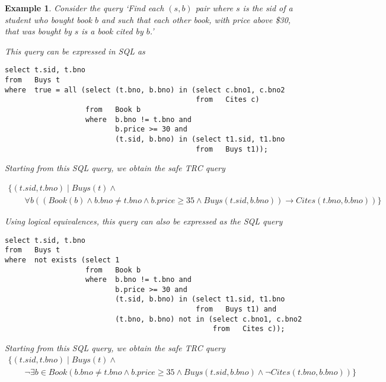 \documentclass[11pt]{article}
\newtheorem{example}{Example}
\begin{document}
\begin{example}
\label{TranslatedSQLtoSafeTRC}
Consider the query `\emph{Find each $(s,b)$ pair where $s$ is the
sid of a student who bought book $b$ and such that each other book, with price above \$30, that was bought by $s$ is a book cited by $b$}.'


This query can be expressed in SQL as
{\small
\begin{verbatim}
select t.sid, t.bno
from   Buys t
where  true = all (select (t.bno, b.bno) in (select c.bno1, c.bno2
                                             from   Cites c)
                   from   Book b
                   where  b.bno != t.bno and 
                          b.price >= 30 and
                          (t.sid, b.bno) in (select t1.sid, t1.bno
                                             from   Buys t1));
\end{verbatim}
}
                                                                
Starting from this SQL query, we obtain the safe TRC query

{\small
\[
\begin{array}{l}
\{(t.sid,t.bno)\mid Buys(t) \land \\
\qquad \forall b\left((Book(b)\land b.bno \neq t.bno\land b.price \geq 35 \land Buys(t.sid, b.bno))\rightarrow Cites(t.bno,b.bno)\right)\}
\end{array}
\]  }                                                              
%

Using logical equivalences, this query can also be expressed as the SQL query
{\small
\begin{verbatim}
select t.sid, t.bno
from   Buys t
where  not exists (select 1
                   from   Book b
                   where  b.bno != t.bno and 
                          b.price >= 30 and
                          (t.sid, b.bno) in (select t1.sid, t1.bno
                                             from   Buys t1) and
                          (t.bno, b.bno) not in (select c.bno1, c.bno2
                                                 from   Cites c));
\end{verbatim}
}
  
Starting from this SQL query, we obtain the safe TRC query
{\small
\[
\begin{array}{l}
\{(t.sid,t.bno)\mid Buys(t) \land \\
\qquad \lnot \exists b\in Book \left(b.bno \neq t.bno\land b.price \geq 35 \land Buys(t.sid, b.bno)\land \lnot Cites(t.bno,b.bno)\right)\}
\end{array}
\]  }                                                              

\end{example}
\end{document}

